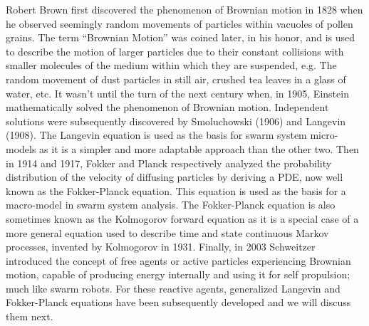 \documentclass[Main.tex]{subfiles}
\begin{document}
Robert Brown first discovered the phenomenon of Brownian motion in 1828 when he observed seemingly random movements of particles within vacuoles of pollen grains. The term ``Brownian Motion'' was coined later, in his honor, and is used to describe the motion of larger particles due to their constant collisions with smaller molecules of the medium within which they are suspended, e.g. The random movement of dust particles in still air, crushed tea leaves in a glass of water, etc. It wasn't until the turn of the next century when, in 1905, Einstein mathematically solved the phenomenon of Brownian motion. Independent solutions were subsequently discovered by Smoluchowski (1906) and Langevin (1908). The Langevin equation is used as the basis for swarm system micro-models as it is a simpler and more adaptable approach than the other two. Then in 1914 and 1917, Fokker and Planck respectively analyzed the probability distribution of the velocity of diffusing particles by deriving a PDE, now well known as the Fokker-Planck equation. This equation is used as the basis for a macro-model in swarm system analysis. The Fokker-Planck equation is also sometimes known as the Kolmogorov forward equation as it is a special case of a more general equation used to describe time and state continuous Markov processes, invented by Kolmogorov in 1931. Finally, in 2003 Schweitzer introduced the concept of free agents or active particles experiencing Brownian motion, capable of producing energy internally and using it for self propulsion; much like swarm robots. For these reactive agents, generalized Langevin and Fokker-Planck equations have been subsequently developed and we will discuss them next.
\end{document}
